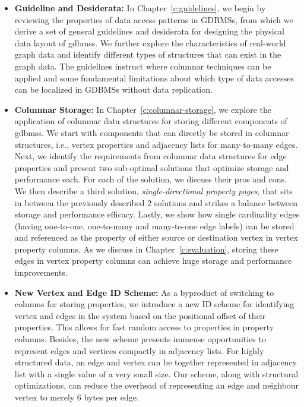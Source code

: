 \begin{itemize}
	\item \textbf{Guideline and Desiderata:} In Chapter~\ref{c:guidelines}, we begin by reviewing the properties of data access patterns in GDBMSs, from which we derive a set of general guidelines and desiderata for designing the physical data layout of \gls{gdbms}s. We further explore the characteristics of real-world graph data and identify different types of structures that can exist in the graph data. The guidelines instruct where columnar techniques can be applied and some fundamental limitations about which type of data accesses can be localized in GDBMSs without data replication.
	
	\item \textbf{Columnar Storage:} In Chapter~\ref{c:columnar-storage}, we explore the application of columnar data structures for storing different
	components of \gls{gdbms}s. We start with components that can directly be stored in columnar structures, i.e., vertex properties and adjacency lists for many-to-many edges. Next, we identify the requirements from columnar data structures for edge properties and present two sub-optimal solutions that optimize storage and performance each. For each of the solution, we discuss their pros and cons. We then describe a third solution, \emph{single-directional property pages}, that sits in between the previously described 2 solutions and strikes a balance between storage and performance efficacy. Lastly, we show how single cardinality edges (having one-to-one, one-to-many and many-to-one edge labels) can be stored and referenced as the property of either source or destination vertex in vertex property columns. As we discuss in Chapter~\ref{c:evaluation}, storing these edges in vertex property columns can achieve huge storage and performance improvements.
	
	\item \textbf{New Vertex and Edge ID Scheme:} As a byproduct of switching to columns for storing properties, we introduce a new ID scheme for identifying vertex and edges in the system based on the positional offset of their properties. This allows for fast random access to properties in property columns. Besides, the new scheme presents immense opportunities to represent edges and vertices compactly in adjacency lists. For highly structured data, an edge and vertex can be together represented in adjacency list with a single value of a very small size. Our scheme, along with structural optimizations, can reduce the overhead of representing an edge and neighbour vertex to merely 6 bytes per edge.
	

\end{itemize}
